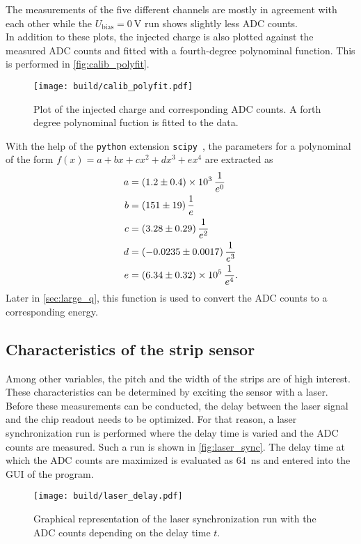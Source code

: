 The measurements of the five different channels are mostly in agreement with each other while the $U_{\mathrm{bias}}=\qty{0}{\volt}$ run shows slightly
less ADC counts. \\
In addition to these plots, the injected charge is also plotted against the measured ADC counts and fitted with a fourth-degree polynominal 
function. This is performed in \autoref{fig:calib_polyfit}. 
\begin{figure}
    \centering
    \texttt{[image: build/calib\_polyfit.pdf]}
    \caption{Plot of the injected charge and corresponding ADC counts. A forth degree polynominal fuction is fitted to the data.}
    \label{fig:calib_polyfit}
\end{figure}
With the help of the \texttt{python} extension \texttt{scipy}~\cite{scipy}, the parameters for
a polynominal of the form $f(x) = a + bx + cx^2 + dx^3 + ex^4$ are extracted as
\begin{align*}
    a &= \qty{1.2(0.4)e3}{\per\raiseto{0}\elementarycharge} \\
    b &= \qty{151+-19}{\per\raiseto{1}\elementarycharge} \\
    c &= \qty{3.28+-0.29}{\per\raiseto{2}\elementarycharge} \\
    d &= \qty{-0.0235+-0.0017}{\per\raiseto{3}\elementarycharge} \\
    e &= \qty{6.34(0.32)e5}{\per\raiseto{4}\elementarycharge}. \\
\end{align*} 
Later in \autoref{sec:large_q}, this function is used to convert the ADC counts to a corresponding energy.

\subsection{Characteristics of the strip sensor}
\label{sec:characteristics_strip_sensor}
Among other variables, the pitch and the width of the strips are of high interest. These characteristics can be determined by exciting the sensor with a laser.
Before these measurements can be conducted, the delay between the laser signal and the chip readout needs to be optimized. For that reason, a laser synchronization
run is performed where the delay time is varied and the ADC counts are measured. Such a run is shown in \autoref{fig:laser_sync}. The delay time at which the ADC
counts are maximized is evaluated as \qty{64}{\nano\second} and entered into the GUI of the program.
\begin{figure}
    \centering
    \texttt{[image: build/laser\_delay.pdf]}
    \caption{Graphical representation of the laser synchronization run with the ADC counts depending on the delay time $t$.}
    \label{fig:laser_sync}
\end{figure}

